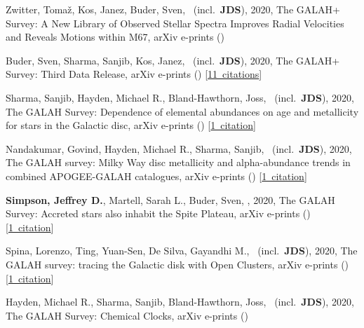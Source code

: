 \item[{\color{numcolor}\scriptsize13}] Zwitter, Toma{\v{z}}, Kos, Janez, Buder, Sven, \etal\ (incl.\ \textbf{JDS}), 2020, The GALAH+ Survey: A New Library of Observed Stellar Spectra Improves Radial Velocities and Reveals Motions within M67, arXiv e-prints ()

\item[{\color{numcolor}\scriptsize12}] Buder, Sven, Sharma, Sanjib, Kos, Janez, \etal\ (incl.\ \textbf{JDS}), 2020, The GALAH+ Survey: Third Data Release, arXiv e-prints () [\href{https://ui.adsabs.harvard.edu/#abs/2020arXiv201102505B}{11~citations}]

\item[{\color{numcolor}\scriptsize11}] Sharma, Sanjib, Hayden, Michael R., Bland-Hawthorn, Joss, \etal\ (incl.\ \textbf{JDS}), 2020, The GALAH Survey: Dependence of elemental abundances on age and metallicity for stars in the Galactic disc, arXiv e-prints () [\href{https://ui.adsabs.harvard.edu/#abs/2020arXiv201113818S}{1~citation}]

\item[{\color{numcolor}\scriptsize10}] Nandakumar, Govind, Hayden, Michael R., Sharma, Sanjib, \etal\ (incl.\ \textbf{JDS}), 2020, The GALAH survey: Milky Way disc metallicity and alpha-abundance trends in combined APOGEE-GALAH catalogues, arXiv e-prints () [\href{https://ui.adsabs.harvard.edu/#abs/2020arXiv201102783N}{1~citation}]

\item[{\color{numcolor}\scriptsize9}] \textbf{Simpson, Jeffrey D.}, Martell, Sarah L., Buder, Sven, \etal, 2020, The GALAH Survey: Accreted stars also inhabit the Spite Plateau, arXiv e-prints () [\href{https://ui.adsabs.harvard.edu/#abs/2020arXiv201102659S}{1~citation}]

\item[{\color{numcolor}\scriptsize8}] Spina, Lorenzo, Ting, Yuan-Sen, De Silva, Gayandhi M., \etal\ (incl.\ \textbf{JDS}), 2020, The GALAH survey: tracing the Galactic disk with Open Clusters, arXiv e-prints () [\href{https://ui.adsabs.harvard.edu/#abs/2020arXiv201102533S}{1~citation}]

\item[{\color{numcolor}\scriptsize7}] Hayden, Michael R., Sharma, Sanjib, Bland-Hawthorn, Joss, \etal\ (incl.\ \textbf{JDS}), 2020, The GALAH Survey: Chemical Clocks, arXiv e-prints ()

